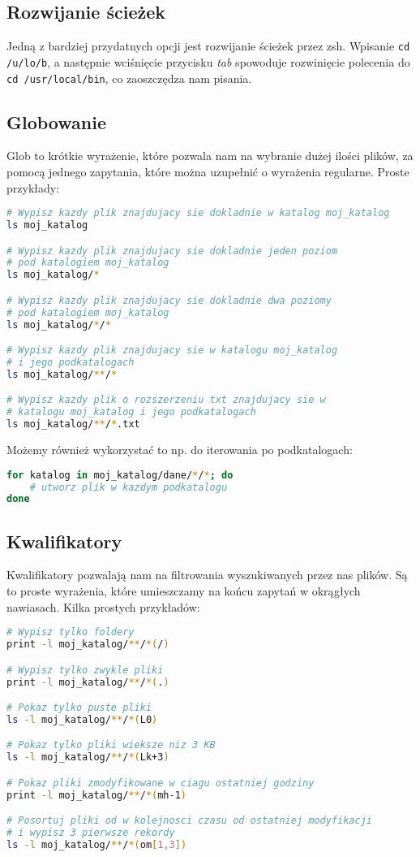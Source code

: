 \documentclass[a4paper]{article}
\begin{document}
\subsection{Rozwijanie ścieżek}
Jedną z bardziej przydatnych opcji jest rozwijanie ścieżek przez zsh.
Wpisanie \texttt{cd /u/lo/b}, a następnie wciśnięcie przycisku \emph{tab} spowoduje rozwinięcie polecenia do \texttt{cd /usr/local/bin}, co zaoszczędza nam pisania.

\subsection{Globowanie}
Glob to krótkie wyrażenie, które pozwala nam na wybranie dużej ilości plików, za pomocą jednego zapytania, które można uzupełnić o wyrażenia regularne.
Proste przykłady:
\begin{lstlisting}[language=bash]
# Wypisz kazdy plik znajdujacy sie dokladnie w katalog moj_katalog
ls moj_katalog

# Wypisz kazdy plik znajdujacy sie dokladnie jeden poziom
# pod katalogiem moj_katalog
ls moj_katalog/*

# Wypisz kazdy plik znajdujacy sie dokladnie dwa poziomy
# pod katalogiem moj_katalog
ls moj_katalog/*/*

# Wypisz kazdy plik znajdujacy sie w katalogu moj_katalog
# i jego podkatalogach
ls moj_katalog/**/*

# Wypisz kazdy plik o rozszerzeniu txt znajdujacy sie w
# katalogu moj_katalog i jego podkatalogach
ls moj_katalog/**/*.txt
\end{lstlisting}

Możemy również wykorzystać to np. do iterowania po podkatalogach:

\begin{lstlisting}[language=bash]
for katalog in moj_katalog/dane/*/*; do
    # utworz plik w kazdym podkatalogu
done
\end{lstlisting}
\subsection{Kwalifikatory}
Kwalifikatory pozwalają nam na filtrowania wyszukiwanych przez nas plików. Są to proste wyrażenia, które umieszczamy na końcu zapytań w okrągłych nawiasach. Kilka prostych przykładów:
\begin{lstlisting}[language=bash]
# Wypisz tylko foldery
print -l moj_katalog/**/*(/)

# Wypisz tylko zwykle pliki
print -l moj_katalog/**/*(.)

# Pokaz tylko puste pliki
ls -l moj_katalog/**/*(L0)

# Pokaz tylko pliki wieksze niz 3 KB
ls -l moj_katalog/**/*(Lk+3)

# Pokaz pliki zmodyfikowane w ciagu ostatniej godziny
print -l moj_katalog/**/*(mh-1)

# Posortuj pliki od w kolejnosci czasu od ostatniej modyfikacji
# i wypisz 3 pierwsze rekordy
ls -l moj_katalog/**/*(om[1,3])
\end{lstlisting}
\end{document}

